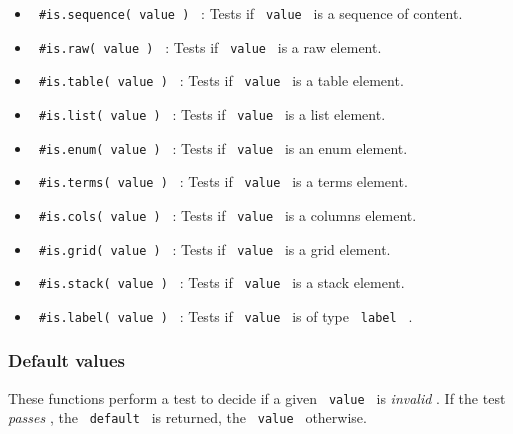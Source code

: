 \begin{itemize}
\begin{Shaded}
\begin{Highlighting}[]
\OperatorTok{,}
\NormalTok{(}\OperatorTok{,}
\end{Highlighting}
\end{Shaded}
\item
  \texttt{\ \#is.sequence(\ value\ )\ } : Tests if \texttt{\ value\ } is
  a sequence of content.
\item
  \texttt{\ \#is.raw(\ value\ )\ } : Tests if \texttt{\ value\ } is a
  raw element.
\item
  \texttt{\ \#is.table(\ value\ )\ } : Tests if \texttt{\ value\ } is a
  table element.
\item
  \texttt{\ \#is.list(\ value\ )\ } : Tests if \texttt{\ value\ } is a
  list element.
\item
  \texttt{\ \#is.enum(\ value\ )\ } : Tests if \texttt{\ value\ } is an
  enum element.
\item
  \texttt{\ \#is.terms(\ value\ )\ } : Tests if \texttt{\ value\ } is a
  terms element.
\item
  \texttt{\ \#is.cols(\ value\ )\ } : Tests if \texttt{\ value\ } is a
  columns element.
\item
  \texttt{\ \#is.grid(\ value\ )\ } : Tests if \texttt{\ value\ } is a
  grid element.
\item
  \texttt{\ \#is.stack(\ value\ )\ } : Tests if \texttt{\ value\ } is a
  stack element.
\item
  \texttt{\ \#is.label(\ value\ )\ } : Tests if \texttt{\ value\ } is of
  type \texttt{\ label\ } .
\end{itemize}

\subsubsection{Default values}\label{default-values}

\begin{Shaded}
\begin{Highlighting}[]
\OperatorTok{:}
\end{Highlighting}
\end{Shaded}

These functions perform a test to decide if a given \texttt{\ value\ }
is \emph{invalid} . If the test \emph{passes} , the \texttt{\ default\ }
is returned, the \texttt{\ value\ } otherwise.

